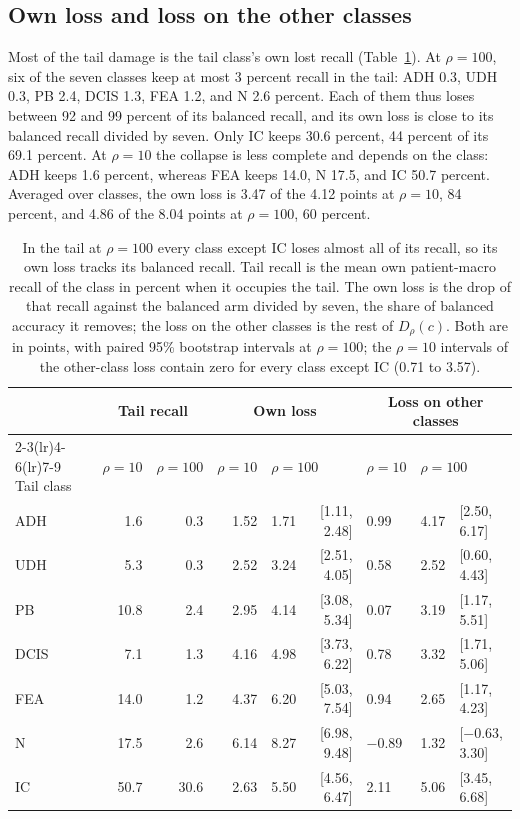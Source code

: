 \subsection{Own loss and loss on the other classes}
\label{sec:split-results}
Most of the tail damage is the tail class's own lost recall (Table~\ref{tab:split}). At $\rho=100$, six of the seven classes keep at most 3 percent recall in the tail: ADH 0.3, UDH 0.3, PB 2.4, DCIS 1.3, FEA 1.2, and N 2.6 percent. Each of them thus loses between 92 and 99 percent of its balanced recall, and its own loss is close to its balanced recall divided by seven. Only IC keeps 30.6 percent, 44 percent of its 69.1 percent. At $\rho=10$ the collapse is less complete and depends on the class: ADH keeps 1.6 percent, whereas FEA keeps 14.0, N 17.5, and IC 50.7 percent. Averaged over classes, the own loss is 3.47 of the 4.12 points at $\rho=10$, 84 percent, and 4.86 of the 8.04 points at $\rho=100$, 60 percent.

\begin{table}[htbp]
\centering
\small
\setlength{\tabcolsep}{4pt}
\renewcommand{\arraystretch}{1.15}
\begin{tabular}{@{}lrrrrrlrl@{}}
\toprule
 & \multicolumn{2}{c}{Tail recall} & \multicolumn{3}{c}{Own loss} & \multicolumn{3}{c}{Loss on other classes} \\
\cmidrule(lr){2-3}\cmidrule(lr){4-6}\cmidrule(lr){7-9}
Tail class & $\rho=10$ & $\rho=100$ & $\rho=10$ & \multicolumn{2}{l}{$\rho=100$} & $\rho=10$ & \multicolumn{2}{l}{$\rho=100$} \\
\midrule
ADH & 1.6 & 0.3 & 1.52 & 1.71 & [1.11, 2.48] & 0.99 & 4.17 & [2.50, 6.17] \\
UDH & 5.3 & 0.3 & 2.52 & 3.24 & [2.51, 4.05] & 0.58 & 2.52 & [0.60, 4.43] \\
PB & 10.8 & 2.4 & 2.95 & 4.14 & [3.08, 5.34] & 0.07 & 3.19 & [1.17, 5.51] \\
DCIS & 7.1 & 1.3 & 4.16 & 4.98 & [3.73, 6.22] & 0.78 & 3.32 & [1.71, 5.06] \\
FEA & 14.0 & 1.2 & 4.37 & 6.20 & [5.03, 7.54] & 0.94 & 2.65 & [1.17, 4.23] \\
N & 17.5 & 2.6 & 6.14 & 8.27 & [6.98, 9.48] & $-$0.89 & 1.32 & [$-$0.63, 3.30] \\
IC & 50.7 & 30.6 & 2.63 & 5.50 & [4.56, 6.47] & 2.11 & 5.06 & [3.45, 6.68] \\
\bottomrule
\end{tabular}
\caption{In the tail at $\rho=100$ every class except IC loses almost all of its recall, so its own loss tracks its balanced recall. Tail recall is the mean own patient-macro recall of the class in percent when it occupies the tail. The own loss is the drop of that recall against the balanced arm divided by seven, the share of balanced accuracy it removes; the loss on the other classes is the rest of $D_\rho(c)$. Both are in points, with paired 95\% bootstrap intervals at $\rho=100$; the $\rho=10$ intervals of the other-class loss contain zero for every class except IC (0.71 to 3.57).}
\label{tab:split}
\end{table}

